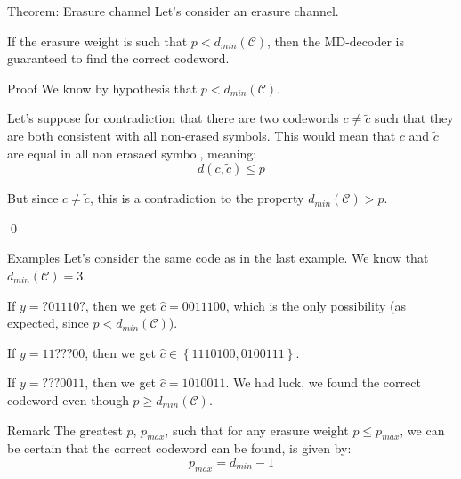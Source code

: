\documentclass[a4paper]{article}
\begin{document}
\begin{parag}{Theorem: Erasure channel}
    Let's consider an erasure channel.

    If the erasure weight is such that $p < d_{min}\left(\mathcal{C}\right)$, then the MD-decoder is guaranteed to find the correct codeword.

    \begin{subparag}{Proof}
        We know by hypothesis that $p < d_{min}\left(\mathcal{C}\right)$.

        Let's suppose for contradiction that there are two codewords $c \neq \widetilde{c}$ such that they are both consistent with all non-erased symbols. This would mean that $c$ and $\widetilde{c}$ are equal in all non erasaed symbol, meaning:
        \[d\left(c, \widetilde{c}\right) \leq p\]

        But since $c \neq \widetilde{c}$, this is a contradiction to the property $d_{min}\left(\mathcal{C}\right) > p$.

        \qed
    \end{subparag}

    \begin{subparag}{Examples}
        Let's consider the same code as in the last example. We know that $d_{min}\left(\mathcal{C}\right) = 3$.

        If $y = ?01110?$, then we get $\hat{c} = 0011100$, which is the only possibility (as expected, since $p < d_{min}\left(\mathcal{C}\right)$).

        If $y = 11???00$, then we get $\hat{c} \in \left\{1110100, 0100111\right\}$.

        If $y = ???0011$, then we get $\hat{c} = 1010011$. We had luck, we found the correct codeword even though $p \geq d_{min}\left(\mathcal{C}\right)$.
    \end{subparag}

    \begin{subparag}{Remark}
        The greatest $p$, $p_{max}$, such that for any erasure weight $p \leq p_{max}$, we can be certain that the correct codeword can be found, is given by: 
        \[p_{max} = d_{min} - 1\]
    \end{subparag}
    
\end{parag}
\end{document}
